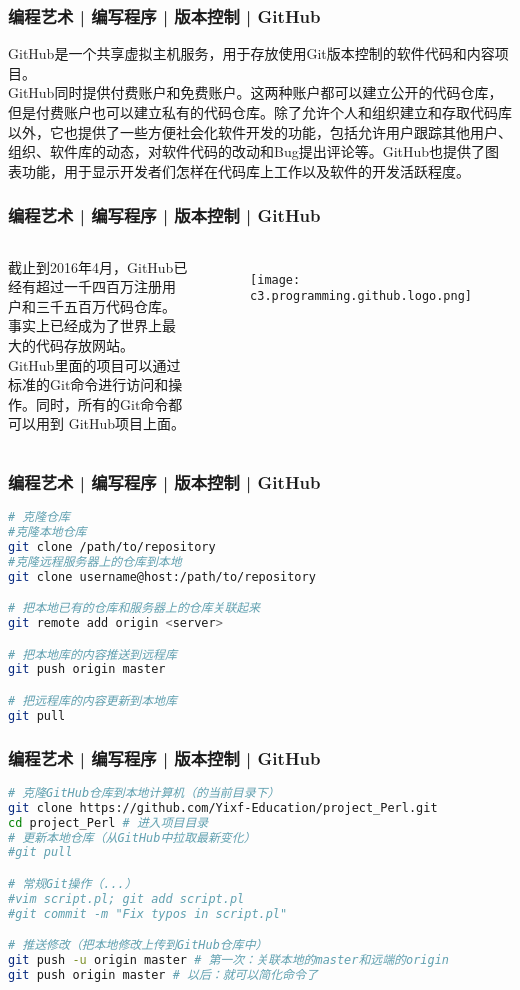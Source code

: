 \begin{frame}
  \frametitle{编程艺术 | 编写程序 | 版本控制 | \alert{GitHub}}
  GitHub是一个共享虚拟主机服务，用于\alert{存放使用Git版本控制的软件代码和内容项目}。\\
  \vspace{1em}
GitHub同时提供付费账户和免费账户。这两种账户都可以建立公开的代码仓库，但是付费账户也可以建立私有的代码仓库。除了允许个人和组织建立和存取代码库以外，它也提供了一些方便社会化软件开发的功能，包括允许用户跟踪其他用户、组织、软件库的动态，对软件代码的改动和Bug提出评论等。GitHub也提供了图表功能，用于显示开发者们怎样在代码库上工作以及软件的开发活跃程度。\\
\end{frame}

\begin{frame}
  \frametitle{编程艺术 | 编写程序 | 版本控制 | \alert{GitHub}}
  \begin{columns}
截止到2016年4月，GitHub已经有超过一千四百万注册用户和三千五百万代码仓库。事实上已经成为了\alert{世界上最大的代码存放网站}。\\
  \vspace{1em}
  GitHub里面的项目可以通过标准的Git命令进行访问和操作。同时，所有的Git命令都可以用到 GitHub项目上面。
    \begin{figure}
      \centering
      \texttt{[image: c3.programming.github.logo.png]}
    \end{figure}
\end{columns}
\end{frame}

\begin{frame}[fragile]
  \frametitle{编程艺术 | 编写程序 | 版本控制 | \alert{GitHub}}
\begin{lstlisting}[language=sh]
# 克隆仓库
#克隆本地仓库
git clone /path/to/repository
#克隆远程服务器上的仓库到本地
git clone username@host:/path/to/repository

# 把本地已有的仓库和服务器上的仓库关联起来
git remote add origin <server>

# 把本地库的内容推送到远程库
git push origin master

# 把远程库的内容更新到本地库
git pull
\end{lstlisting}
\end{frame}

\begin{frame}[fragile]
  \frametitle{编程艺术 | 编写程序 | 版本控制 | GitHub}
\begin{lstlisting}[language=sh]
# 克隆GitHub仓库到本地计算机（的当前目录下）
git clone https://github.com/Yixf-Education/project_Perl.git
cd project_Perl # 进入项目目录
# 更新本地仓库（从GitHub中拉取最新变化）
#git pull

# 常规Git操作（...）
#vim script.pl; git add script.pl
#git commit -m "Fix typos in script.pl" 

# 推送修改（把本地修改上传到GitHub仓库中）
git push -u origin master # 第一次：关联本地的master和远端的origin
git push origin master # 以后：就可以简化命令了
\end{lstlisting}
\end{frame}


